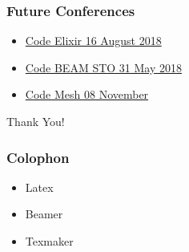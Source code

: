 \documentclass{beamer}
\begin{document}
  \begin{frame}
    \frametitle{Future Conferences}

    \begin{itemize}
      \item \href{https://codesync.global/conferences/code-elixir-2018}{Code Elixir 16 August 2018}
      \item \href{https://codesync.global/conferences/code-beam-sto-2018}{Code BEAM STO 31 May 2018}
      \item \href{https://codesync.global/conferences/code-mesh-2018}{Code Mesh 08 November}    
    \end{itemize}
  \end{frame}

  \begin{frame}
    \begin{center}
    \Huge Thank You!
    \end{center}
  \end{frame}
    
  \begin{frame}
    \frametitle{Colophon}
    
    \begin{itemize}
    \item Latex
    \item Beamer
    \item Texmaker
    \end{itemize}
    
  \end{frame}
  
  
  
\end{document}
